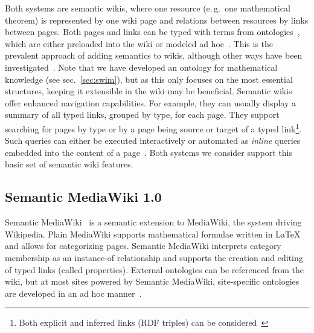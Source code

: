 \begin{background}
Both systems are semantic wikis, where one resource %
(e.\,g.\ one mathematical theorem) is represented by one wiki page and relations
between resources by links between pages.  Both pages and links can be typed
with terms from ontologies~\cite{OrDeMoVoHa06:annotation-navigation-semwiki},
which are either preloaded into the wiki or modeled ad
hoc~\cite{KrSchVr:semwiki-reasoning07}.  This is the prevalent approach of
adding semantics to wikis, although other ways have been
investigated~\cite{semwiki06}.  Note that we have developed an ontology for
mathematical knowledge (see sec.~\ref{sec:swim}), but as this only focuses on
the most essential structures, keeping it extensible in the wiki may be
beneficial.  Semantic wikis offer enhanced navigation capabilities.  For
example, they can usually display a summary of all typed links, grouped by type,
for each page.  They support searching for pages by type or by a page being
source or target of a typed link\footnote{Both explicit and inferred links (RDF
  triples) can be considered~\cite{KrSchVr:semwiki-reasoning07}}.  Such queries
can either be executed interactively or automated as \emph{inline} queries
embedded into the content of a page~\cite{KrSchVr:semwiki-reasoning07}.  Both
systems we consider support this basic set of semantic wiki features.
\end{background}

\subsection{Semantic MediaWiki 1.0}
\label{sec:smw-study}

\begin{background}
Semantic MediaWiki~\cite{KrSchVr:semwiki-reasoning07} is a semantic extension to
MediaWiki, the system driving Wikipedia.  Plain MediaWiki supports mathematical
formulae written in {\LaTeX} and allows for categorizing pages.  Semantic
MediaWiki interprets category membership as an instance-of relationship and
supports the creation and editing of typed links (called properties).  External
ontologies can be referenced from the wiki, but at most sites powered by
Semantic MediaWiki, site-specific ontologies are developed in an ad hoc
manner~\cite{ontoworld:sites-using-smw}.
\end{background}

